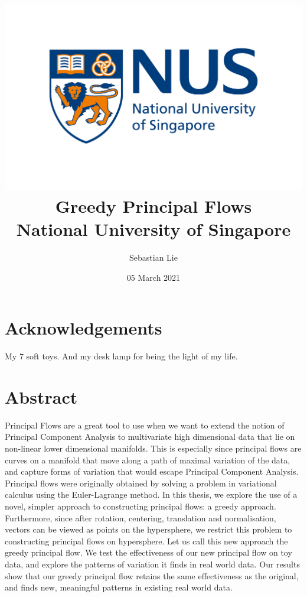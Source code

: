\documentclass[12pt]{report}
\begin{document}
\title{
{\includegraphics[width=0.7\columnwidth]{university.jpg}}\\
{Greedy Principal Flows}\\
{\large National University of Singapore}\\
}
\author{Sebastian Lie}
\date{05 March 2021}
\maketitle

\chapter*{Acknowledgements}
My 7 soft toys. And my desk lamp for being the light of my life.

\chapter*{Abstract}

Principal Flows are a great tool to use when we want to extend the 
notion of Principal Component Analysis to multivariate high dimensional data that 
lie on non-linear lower dimensional manifolds.
This is especially since principal flows are curves on a manifold 
that move along a path of maximal variation of the data, and capture forms of
variation that would escape Principal Component Analysis.
Principal flows were originally obtained by solving a problem
in variational calculus using the Euler-Lagrange method. 
In this thesis, we explore the use of a novel, simpler approach to constructing 
principal flows: a greedy approach.
Furthermore, since after rotation, centering, translation 
and normalisation, vectors can be viewed as points on the hypersphere, 
we restrict this problem to constructing principal flows on hypersphere.
Let us call this new approach the greedy principal flow.
We test the effectiveness of our new principal flow on toy data, and
explore the patterns of variation it finds in real world data. Our results show that
our greedy principal flow retains the same effectiveness as the original, and
finds new, meaningful patterns in existing real world data.
\end{document}
